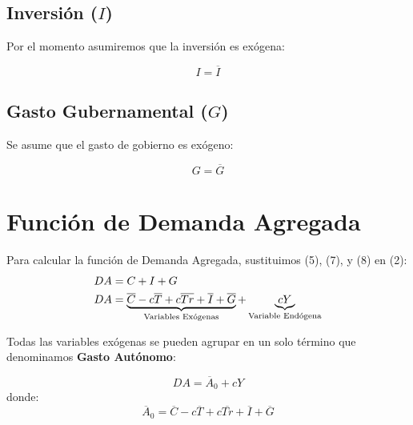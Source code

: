 \documentclass[11pt,a4paper]{article}
\newcommand{\barvar}[1]{\overline{#1}}
\begin{document}
\subsection{Inversión ($I$)}

Por el momento asumiremos que la inversión es exógena:

\begin{resultadobox}[Inversión]
\begin{equation}
    I = \barvar{I} \tag{7}
\end{equation}
\end{resultadobox}

\subsection{Gasto Gubernamental ($G$)}

Se asume que el gasto de gobierno es exógeno:

\begin{resultadobox}
\begin{equation}
    G = \barvar{G} \tag{8}
\end{equation}
\end{resultadobox}

\section{Función de Demanda Agregada}

Para calcular la función de Demanda Agregada, sustituimos (5), (7), y (8) en (2):
\begin{align}
    DA &= C + I + G \notag \\
    DA &= \underbrace{\barvar{C} - c\barvar{T} + c\barvar{Tr} + \barvar{I} + \barvar{G}}_{\text{Variables Exógenas}} + \underbrace{cY}_{\text{Variable Endógena}} \notag
\end{align}

Todas las variables exógenas se pueden agrupar en un solo término que denominamos \textbf{Gasto Autónomo}:

\begin{resultadobox}
\begin{equation}
    DA = \barvar{A}_0 + cY \tag{9}
\end{equation}
donde:
\[
    \barvar{A}_0 = \barvar{C} - c\barvar{T} + c\barvar{Tr} + \barvar{I} + \barvar{G}
\]
\end{resultadobox}
\end{document}
